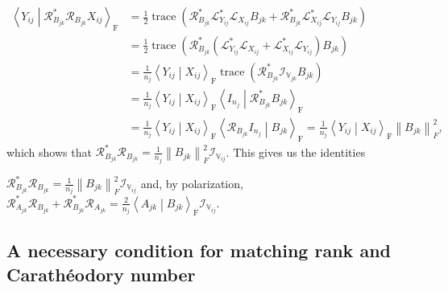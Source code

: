 \documentclass[oneside]{amsart}
\theoremstyle{plain}
\theoremstyle{definition}
\theoremstyle{remark}
\numberwithin{equation}{section}
\DeclareMathOperator{\trace}{trace}
\begin{document}
\[
\begin{split}
\left\langle Y_{ij} \middle| \mathcal{R}^{*}_{B_{jk}} \mathcal{R}_{B_{jk}}
X_{ij} \right\rangle_{\mathrm{F}}
%
&= \frac{1}{2} \trace\left( \mathcal{R}^{*}_{B_{jk}}
\mathcal{L}^{*}_{Y_{ij}} \mathcal{L}_{X_{ij}} B_{jk} +
\mathcal{R}^{*}_{B_{jk}} \mathcal{L}^{*}_{X_{ij}} \mathcal{L}_{Y_{ij}}
B_{jk} \right)
\\
&= \frac{1}{2} \trace\left( \mathcal{R}^{*}_{B_{jk}} \left(
\mathcal{L}^{*}_{Y_{ij}} \mathcal{L}_{X_{ij}} + \mathcal{L}^{*}_{X_{ij}}
\mathcal{L}_{Y_{ij}} \right) B_{jk} \right)
\\
&= \frac{1}{n_{j}} \left\langle Y_{ij} \middle| X_{ij}
\right\rangle_{\mathrm{F}} \trace\left( \mathcal{R}^{*}_{B_{jk}}
\mathcal{I}_{\mathbb{V}_{jk}} B_{jk} \right)
\\
&= \frac{1}{n_{j}} \left\langle Y_{ij} \middle| X_{ij}
\right\rangle_{\mathrm{F}} \left\langle I_{n_{j}} \middle|
\mathcal{R}^{*}_{B_{jk}} B_{jk} \right\rangle_{\mathrm{F}}
\\
&= \frac{1}{n_{j}} \left\langle Y_{ij} \middle| X_{ij}
\right\rangle_{\mathrm{F}} \left\langle \mathcal{R}_{B_{jk}} I_{n_{j}}
\middle| B_{jk} \right\rangle_{\mathrm{F}}
%
= \frac{1}{n_{j}} \left\langle Y_{ij} \middle| X_{ij}
\right\rangle_{\mathrm{F}} \left\lVert B_{jk}\right\rVert_{F}^{2},
\end{split}
\]
which shows that $\mathcal{R}^{*}_{B_{jk}} \mathcal{R}_{B_{jk}} =
\frac{1}{n_{j}} \left\lVert B_{jk}\right\rVert_{F}^{2}
\mathcal{I}_{\mathbb{V}_{ij}}$. This gives us the identities
\begin{enumerate}[label={[\Alph*]},
ref={[\Alph*]}]
\addtocounter{enumi}{7}%
\item\label{identity:rightadjointself}%
$\mathcal{R}^{*}_{B_{jk}} \mathcal{R}_{B_{jk}} = \frac{1}{n_{j}}
\left\lVert B_{jk}\right\rVert_{F}^{2} \mathcal{I}_{\mathbb{V}_{ij}}$ and,
by polarization, $\mathcal{R}^{*}_{A_{jk}} \mathcal{R}_{B_{jk}} +
\mathcal{R}^{*}_{B_{jk}} \mathcal{R}_{A_{jk}} = \frac{2}{n_{j}}
\left\langle A_{jk} \middle| B_{jk} \right\rangle_{\mathrm{F}}
\mathcal{I}_{\mathbb{V}_{ij}}$.

\end{enumerate}

\subsection{A necessary condition for matching rank and Carath\'eodory
number}
\label{section:Caratheodorynumbersnecessary}
\end{document}
